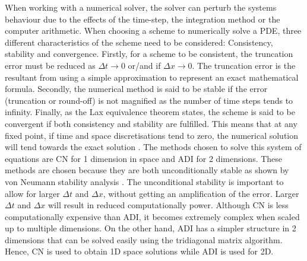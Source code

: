 When working with a numerical solver, the solver can perturb the systems behaviour due to the effects of the time-step, the integration method or the computer arithmetic.
When choosing a scheme to numerically solve a PDE, three different characteristics of the scheme need to be considered: Consistency, stability and convergence.
Firstly, for a scheme to be consistent, the truncation error must be reduced as $\Delta t \rightarrow 0$ or/and if $\Delta x \rightarrow 0$.
The truncation error is the resultant from using a simple approximation to represent an exact mathematical formula.
Secondly, the numerical method is said to be stable if the error (truncation or round-off) is not magnified as the number of time steps tends to infinity.
Finally, as the Lax equivalence theorem states, the scheme is said to be convergent if both consistency and stability are fulfilled.
This means that at any fixed point, if  time and space discretisations tend to zero, the numerical solution will tend towards the exact solution \parencite{smith1985numerical}.
The methods chosen to solve this system of equations are \acrfull{CN} for 1 dimension in space and \acrfull{ADI} for 2 dimensions. These methods are chosen because they are both unconditionally stable as shown by von Neumann stability analysis \parencite{strikwerda2004finite}. The unconditional stability is important to allow for larger $\Delta t$ and $\Delta x$, without getting an amplification of the error. Larger $\Delta t$ and $\Delta x$ will result in reduced computationally power. Although \acrshort{CN} is less computationally expensive than \acrshort{ADI}, it becomes extremely complex when scaled up to multiple dimensions. On the other hand, \acrshort{ADI} has a simpler structure in 2 dimensions that can be solved easily using the tridiagonal matrix algorithm. Hence, \acrshort{CN} is used to obtain 1D space solutions while \acrshort{ADI} is used for 2D.
